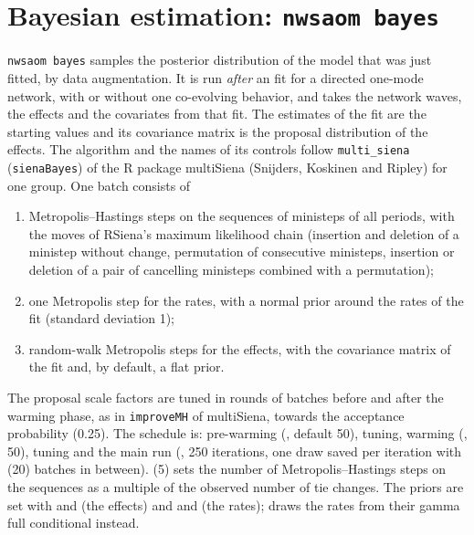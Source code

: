 \section{Bayesian estimation: \texttt{nwsaom bayes}}\label{sec:bayes}
\texttt{nwsaom bayes} samples the posterior distribution of the model that was just fitted, by data augmentation. It is run \emph{after} an \nwsaom{} fit for a directed one-mode network, with or without one co-evolving behavior, and takes the network waves, the effects and the covariates from that fit. The estimates of the fit are the starting values and its covariance matrix is the proposal distribution of the effects. The algorithm and the names of its controls follow \texttt{multi\_siena} (\texttt{sienaBayes}) of the R package multiSiena (Snijders, Koskinen and Ripley) for one group. One batch consists of
\begin{enumerate}[nosep]
\item Metropolis--Hastings steps on the sequences of ministeps of all periods, with the moves of RSiena's maximum likelihood chain (insertion and deletion of a ministep without change, permutation of consecutive ministeps, insertion or deletion of a pair of cancelling ministeps combined with a permutation);
\item one Metropolis step for the rates, with a normal prior around the rates of the fit (standard deviation 1);
\item {} random-walk Metropolis steps for the effects, with the covariance matrix of the fit and, by default, a flat prior.
\end{enumerate}
The proposal scale factors are tuned in rounds of  batches before and after the warming phase, as in \texttt{improveMH} of multiSiena, towards the acceptance probability  (0.25). The schedule is: pre-warming (, default 50), tuning, warming (, 50), tuning and the main run (, 250 iterations, one draw saved per iteration with  (20) batches in between).  (5) sets the number of Metropolis--Hastings steps on the sequences as a multiple of the observed number of tie changes. The priors are set with  and  (the effects) and  and  (the rates);  draws the rates from their gamma full conditional instead.

